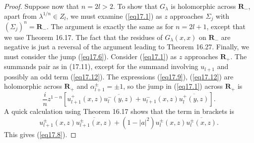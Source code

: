 \documentclass{surv-l}
\theoremstyle{plain}
\theoremstyle{definition}
\numberwithin{equation}{chapter}
\begin{document}
\begin{proof}
Suppose now that $n=2l>2$. To show that $G_{\lambda}$ is holomorphic across $\mathbf{R}_{-}$, apart from $\lambda^{1/n}\in Z_{l}$, we must examine (\ref{eq17.1}) as $z$ approaches $\Sigma_{j}$ with $(\Sigma_{j})^{n}=\mathbf{R}_{-}$. The argument is exactly the same as for $n=2l+1$, except that we use Theorem 16.17. The fact that the residues of $G_{\lambda}(x, x)$ on $\mathbf{R}_{-}$ are negative is just a reversal of the argument leading to Theorem 16.27. Finally, we must consider the jump (\ref{eq17.6}). Consider (\ref{eq17.1}) as $z$ approaches $ \mathbf{R}_{+}$. The summands pair as in (17.11), except for the summand involving $u_{l+1}$ and possibly an odd term (\ref{eq17.12}). The expressions (\ref{eq17.9}), (\ref{eq17.12}) are holomorphic across $\mathbf{R}_{+}$ and $\alpha_{l+1}^{\pm}=\pm 1$, so the jump in (\ref{eq17.1}) across $\mathbf{R}_{+}$ is
\begin{equation}\label{eq17.14}
\frac{i}{n}z^{1-n}[u_{l+1}^{+}(x, z)\overline{u_{l}^{-}(y,z)}+u_{l+1}^{-}(x, z)\overline{u_{l}^{+}(y,z)}].
\end{equation}
A quick calculation using Theorem 16.17 shows that the term in brackets is
\begin{equation}\label{eq17.15}
u_{l+1}^{\pm}(x, z)\overline{u_{l+1}^{\pm}(x,z)}+(1-|a|^{2})u_{l}^{\pm}(x, z)\overline{u_{l}^{\pm}(x,z)}.
\end{equation}
This gives (\ref{eq17.8}).
\end{proof}
\setcounter{theorem}{15}
\end{document}
